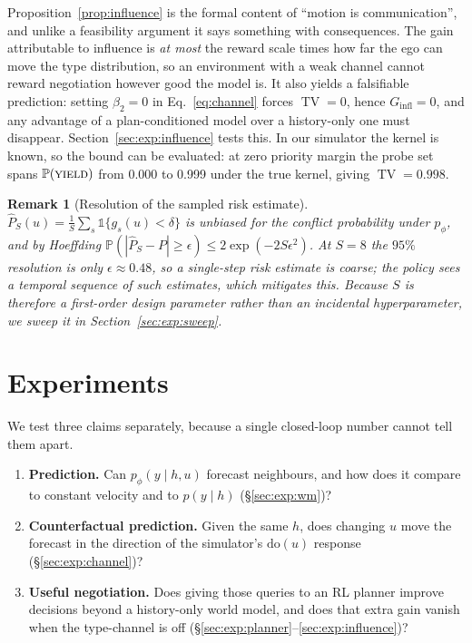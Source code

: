 \documentclass[conference]{IEEEtran}
\DeclareMathOperator{\TV}{TV}
\newcommand{\Prob}{\mathbb{P}}
\newcommand{\yield}{\textsc{yield}}
\newcommand{\probeYieldBrake}{0.000}
\newcommand{\probeYieldAssert}{0.999}
\newcommand{\gtTV}{0.998}
\newtheorem{remark}{Remark}
\begin{document}
Proposition~\ref{prop:influence} is the formal content of ``motion is
communication'', and unlike a feasibility argument it says something with
consequences. The gain attributable to influence is \emph{at most} the reward
scale times how far the ego can move the type distribution, so an environment
with a weak channel cannot reward negotiation however good the model is. It also
yields a falsifiable prediction: setting $\beta_2 = 0$ in
Eq.~\eqref{eq:channel} forces $\TV = 0$, hence $G_{\mathrm{infl}} = 0$, and any
advantage of a plan-conditioned model over a history-only one must disappear.
Section~\ref{sec:exp:influence} tests this. In our simulator the kernel is known,
so the bound can be evaluated: at zero priority margin the probe set spans
$\Prob(\yield)$ from \probeYieldBrake{} to \probeYieldAssert{} under the true
kernel, giving $\TV = \gtTV$.

\begin{remark}[Resolution of the sampled risk estimate]
\label{rem:hoeffding}
$\hat P_S(u) = \frac{1}{S}\sum_s \mathbb{1}\{g_s(u) < \delta\}$ is unbiased for
the conflict probability under $p_\phi$, and by Hoeffding
$\Prob(|\hat P_S - P| \ge \epsilon) \le 2\exp(-2S\epsilon^2)$. At $S = 8$ the
$95\%$ resolution is only $\epsilon \approx 0.48$, so a single-step risk estimate
is coarse; the policy sees a temporal sequence of such estimates, which mitigates
this. Because $S$ is therefore a first-order design parameter rather than an
incidental hyperparameter, we sweep it in Section~\ref{sec:exp:sweep}.
\end{remark}

\section{Experiments}
\label{sec:exp}

We test three claims separately, because a single closed-loop number cannot
tell them apart.

\begin{enumerate}\itemsep2pt
\item[\textbf{Q1}] \textbf{Prediction.} Can $p_\phi(y\mid h,u)$ forecast
neighbours, and how does it compare to constant velocity and to $p(y\mid h)$
(\S\ref{sec:exp:wm})?
\item[\textbf{Q2}] \textbf{Counterfactual prediction.} Given the same $h$, does
changing $u$ move the forecast in the direction of the simulator's
$\mathrm{do}(u)$ response (\S\ref{sec:exp:channel})?
\item[\textbf{Q3}] \textbf{Useful negotiation.} Does giving those queries to an
RL planner improve decisions beyond a history-only world model, and does that
extra gain vanish when the type-channel is off
(\S\ref{sec:exp:planner}--\ref{sec:exp:influence})?
\end{enumerate}
\end{document}
